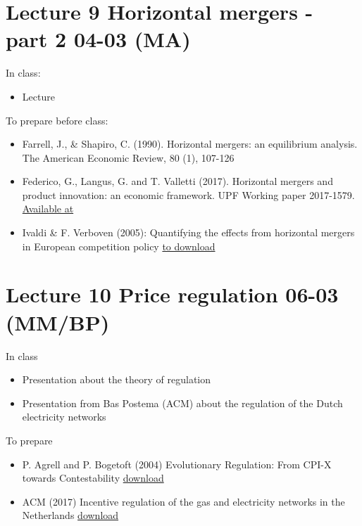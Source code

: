 \documentclass[]{book}
\providecommand{\tightlist}{%
  \setlength{\itemsep}{0pt}\setlength{\parskip}{0pt}}
\begin{document}
\section{Lecture 9 Horizontal mergers - part 2 04-03
(MA)}\label{lecture-9-horizontal-mergers---part-2-04-03-ma}

In class:

\begin{itemize}
\tightlist
\item
  Lecture
\end{itemize}

To prepare before class:

\begin{itemize}
\tightlist
\item
  Farrell, J., \& Shapiro, C. (1990). Horizontal mergers: an equilibrium
  analysis. The American Economic Review, 80 (1), 107-126
\item
  Federico, G., Langus, G. and T. Valletti (2017). Horizontal mergers
  and product innovation: an economic framework. UPF Working paper
  2017-1579.
  \href{https://papers.ssrn.com/sol3/papers.cfm?abstract_id=2999178M}{Available
  at}
\item
  Ivaldi \& F. Verboven (2005): Quantifying the effects from horizontal
  mergers in European competition policy
  \href{https://ideas.repec.org/p/cpr/ceprdp/2697.html}{to download}
\end{itemize}

\section{Lecture 10 Price regulation 06-03
(MM/BP)}\label{lecture-10-price-regulation-06-03-mmbp}

In class

\begin{itemize}
\tightlist
\item
  Presentation about the theory of regulation
\item
  Presentation from Bas Postema (ACM) about the regulation of the Dutch
  electricity networks
\end{itemize}

To prepare

\begin{itemize}
\item
  P. Agrell and P. Bogetoft (2004) Evolutionary Regulation: From CPI-X
  towards Contestability
  \href{https://www.sumicsid.com/reg/papers/encore.pdf}{download}
\item
  ACM (2017) Incentive regulation of the gas and electricity networks in
  the Netherlands
  \href{https://www.acm.nl/sites/default/files/old_publication/publicaties/17231_incentive-regulation-of-the-gas-and-elektricity-networks-in-the-netherlands-2017-05-17.pdf}{download}
\end{itemize}
\end{document}
